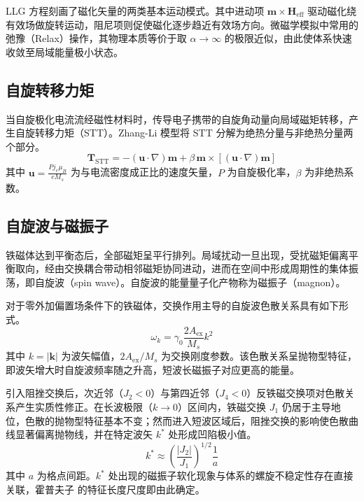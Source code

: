 LLG 方程刻画了磁化矢量的两类基本运动模式。其中进动项 $\mathbf{m} \times \mathbf{H}_{\text{eff}}$ 驱动磁化绕有效场做旋转运动，阻尼项则促使磁化逐步趋近有效场方向。微磁学模拟中常用的弛豫（Relax）操作，其物理本质等价于取 $\alpha \to \infty$ 的极限近似，由此使体系快速收敛至局域能量极小状态。

\subsection{自旋转移力矩}
当自旋极化电流流经磁性材料时，传导电子携带的自旋角动量向局域磁矩转移，产生自旋转移力矩（STT）。Zhang-Li 模型将 STT 分解为绝热分量与非绝热分量两个部分。
\begin{equation}
  \mathbf{T}_{\text{STT}} = -(\mathbf{u} \cdot \nabla)\mathbf{m} + \beta \, \mathbf{m} \times [(\mathbf{u} \cdot \nabla)\mathbf{m}]
  \label{eq:stt}
\end{equation}
其中 $\mathbf{u} = \frac{P j_e \mu_B}{e M_s}$ 为与电流密度成正比的速度矢量，$P$ 为自旋极化率，$\beta$ 为非绝热系数。


\subsection{自旋波与磁振子}
铁磁体达到平衡态后，全部磁矩呈平行排列。局域扰动一旦出现，受扰磁矩偏离平衡取向，经由交换耦合带动相邻磁矩协同进动，进而在空间中形成周期性的集体振荡，即自旋波（spin wave）。自旋波的能量量子化产物称为磁振子（magnon）。

对于零外加偏置场条件下的铁磁体，交换作用主导的自旋波色散关系具有如下形式。
\begin{equation}
  \omega_k = \gamma_0 \frac{2A_{\text{ex}}}{M_s} k^2
  \label{eq:sw-dispersion}
\end{equation}
其中 $k = |\mathbf{k}|$ 为波矢幅值，$2A_{\text{ex}}/M_s$ 为交换刚度参数。该色散关系呈抛物型特征，即波矢增大时自旋波频率随之升高，短波长磁振子对应更高的能量。

引入阻挫交换后，次近邻（$J_2 < 0$）与第四近邻（$J_4 < 0$）反铁磁交换项对色散关系产生实质性修正。在长波极限（$k \to 0$）区间内，铁磁交换 $J_1$ 仍居于主导地位，色散的抛物型特征基本不变；然而进入短波区域后，阻挫交换的影响使色散曲线显著偏离抛物线，并在特定波矢 $k^*$ 处形成凹陷极小值。
\begin{equation}
  k^* \approx \left(\frac{|J_2|}{J_1}\right)^{1/2} \frac{1}{a}
  \label{eq:sw-kstar}
\end{equation}
其中 $a$ 为格点间距。$k^*$ 处出现的磁振子软化现象与体系的螺旋不稳定性存在直接关联，霍普夫子 的特征长度尺度即由此确定。

